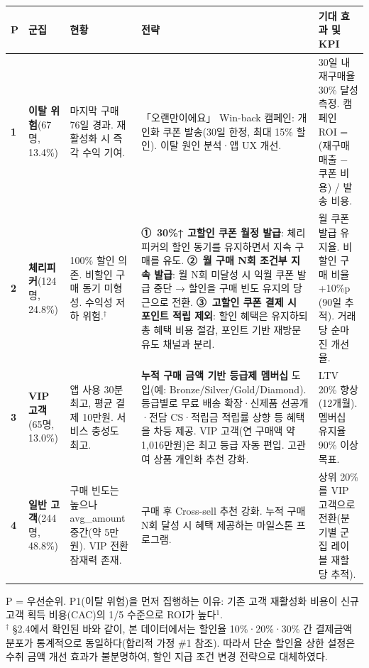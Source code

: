 \documentclass[a4paper, 11pt]{article}
\begin{document}
\begin{center}
\small
\renewcommand{\arraystretch}{1.5}
\begin{tabular}{p{0.5cm}p{2cm}p{2.8cm}p{4.8cm}p{3cm}}
\toprule
\textbf{P} & \textbf{군집} & \textbf{현황} & \textbf{전략} & \textbf{기대 효과 및 KPI} \\
\midrule
\textbf{1} &
\textbf{이탈 위험}\newline(67명, 13.4\%) &
마지막 구매 76일 경과. 재활성화 시 즉각 수익 기여. &
「오랜만이에요」 Win-back 캠페인: 개인화 쿠폰 발송(30일 한정, 최대 15\% 할인). 이탈 원인 분석·앱 UX 개선. &
30일 내 재구매율 30\% 달성 측정. 캠페인 ROI = (재구매 매출 $-$ 쿠폰 비용) / 발송 비용. \\
\midrule
\textbf{2} &
\textbf{체리피커}\newline(124명, 24.8\%) &
100\% 할인 의존. 비할인 구매 동기 미형성. 수익성 저하 위험.$^\dagger$ &
\textbf{①~30\%↑ 고할인 쿠폰 월정 발급}: 체리피커의 할인 동기를 유지하면서 지속 구매를 유도. \textbf{②~월 구매 N회 조건부 지속 발급}: 월 N회 미달성 시 익월 쿠폰 발급 중단 → 할인을 구매 빈도 유지의 당근으로 전환. \textbf{③~고할인 쿠폰 결제 시 포인트 적립 제외}: 할인 혜택은 유지하되 총 혜택 비용 절감, 포인트 기반 재방문 유도 채널과 분리. &
월 쿠폰 발급 유지율. 비할인 구매 비율 +10\%p (90일 추적). 거래당 순마진 개선율. \\
\midrule
\textbf{3} &
\textbf{VIP 고객}\newline(65명, 13.0\%) &
앱 사용 30분 최고, 평균 결제 10만원. 서비스 충성도 최고. &
\textbf{누적 구매 금액 기반 등급제 멤버십} 도입(예: Bronze/Silver/Gold/Diamond). 등급별로 무료 배송 확장·신제품 선공개·전담 CS·적립금 적립률 상향 등 혜택을 차등 제공. VIP 고객(연 구매액 약 1,016만원)은 최고 등급 자동 편입. 고관여 상품 개인화 추천 강화. &
LTV 20\% 향상(12개월). 멤버십 유지율 90\% 이상 목표. \\
\midrule
\textbf{4} &
\textbf{일반 고객}\newline(244명, 48.8\%) &
구매 빈도는 높으나 avg\_amount 중간(약 5만원). VIP 전환 잠재력 존재. &
구매 후 Cross-sell 추천 강화. 누적 구매 N회 달성 시 혜택 제공하는 마일스톤 프로그램. &
상위 20\%를 VIP 고객으로 전환(분기별 군집 레이블 재할당 추적). \\
\bottomrule
\end{tabular}
\end{center}

{\small P = 우선순위. P1(이탈 위험)을 먼저 집행하는 이유: 기존 고객 재활성화 비용이 신규 고객 획득 비용(CAC)의 1/5 수준으로 ROI가 높다$^1$.\\
$^\dagger$ \S2.4에서 확인된 바와 같이, 본 데이터에서는 할인율 10\%·20\%·30\% 간 결제금액 분포가 통계적으로 동일하다(합리적 가정 \#1 참조). 따라서 단순 할인율 상한 설정은 수취 금액 개선 효과가 불분명하여, 할인 지급 조건 변경 전략으로 대체하였다.}
\end{document}
